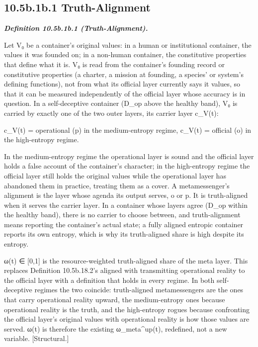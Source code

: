 \documentclass[
]{article}
\begin{document}
\hypertarget{b.1b.1-truth-alignment}{%
\subsection{10.5b.1b.1 Truth-Alignment}\label{b.1b.1-truth-alignment}}

\emph{\textbf{Definition 10.5b.1b.1 (Truth-Alignment).}}

Let V₀ be a container's original values: in a human or institutional
container, the values it was founded on; in a non-human container, the
constitutive properties that define what it is. V₀ is read from the
container's founding record or constitutive properties (a charter, a
mission at founding, a species' or system's defining functions), not
from what its official layer currently says it values, so that it can be
measured independently of the official layer whose accuracy is in
question. In a self-deceptive container (D\_op above the healthy band),
V₀ is carried by exactly one of the two outer layers, its carrier layer
c\_V(t):

c\_V(t) = operational (p) in the medium-entropy regime, c\_V(t) =
official (o) in the high-entropy regime.

In the medium-entropy regime the operational layer is sound and the
official layer holds a false account of the container's character; in
the high-entropy regime the official layer still holds the original
values while the operational layer has abandoned them in practice,
treating them as a cover. A metamessenger's alignment is the layer whose
agenda its output serves, o or p. It is truth-aligned when it serves the
carrier layer. In a container whose layers agree (D\_op within the
healthy band), there is no carrier to choose between, and
truth-alignment means reporting the container's actual state; a fully
aligned entropic container reports its own entropy, which is why its
truth-aligned share is high despite its entropy.

ω(t) ∈ {[}0,1{]} is the resource-weighted truth-aligned share of the
meta layer. This replaces Definition 10.5b.18.2's
\textquotesingle aligned with transmitting operational reality to the
official layer\textquotesingle{} with a definition that holds in every
regime. In both self-deceptive regimes the two coincide: truth-aligned
metamessengers are the ones that carry operational reality upward, the
medium-entropy ones because operational reality is the truth, and the
high-entropy rogues because confronting the official layer's original
values with operational reality is how those values are served. ω(t) is
therefore the existing ω\_meta\^{}up(t), redefined, not a new variable.
{[}Structural.{]}
\end{document}
